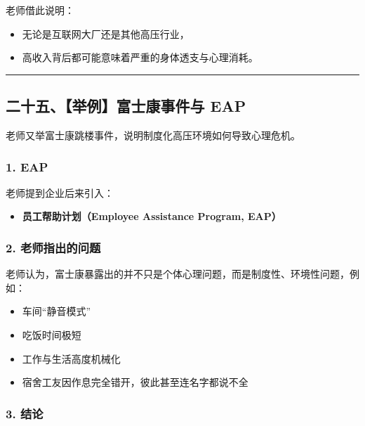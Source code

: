 \documentclass[
  chinese,
  9pt,
  a4paper,
]{ctexart}
\providecommand{\tightlist}{%
  \setlength{\itemsep}{0pt}\setlength{\parskip}{0pt}}
\begin{document}
老师借此说明：

\begin{itemize}
\tightlist
\item
  无论是互联网大厂还是其他高压行业，
\item
  高收入背后都可能意味着严重的身体透支与心理消耗。
\end{itemize}

\begin{center}\rule{0.5\linewidth}{0.5pt}\end{center}

\subsection{二十五、【举例】富士康事件与
EAP}\label{ux4e8cux5341ux4e94ux4e3eux4f8bux5bccux58ebux5eb7ux4e8bux4ef6ux4e0e-eap}

老师又举富士康跳楼事件，说明制度化高压环境如何导致心理危机。

\subsubsection{1. EAP}\label{eap}

老师提到企业后来引入：

\begin{itemize}
\tightlist
\item
  \textbf{员工帮助计划（Employee Assistance Program, EAP）}
\end{itemize}

\subsubsection{2.
老师指出的问题}\label{ux8001ux5e08ux6307ux51faux7684ux95eeux9898}

老师认为，富士康暴露出的并不只是个体心理问题，而是制度性、环境性问题，例如：

\begin{itemize}
\tightlist
\item
  车间``静音模式''
\item
  吃饭时间极短
\item
  工作与生活高度机械化
\item
  宿舍工友因作息完全错开，彼此甚至连名字都说不全
\end{itemize}

\subsubsection{3. 结论}\label{ux7ed3ux8bba-2}
\end{document}
